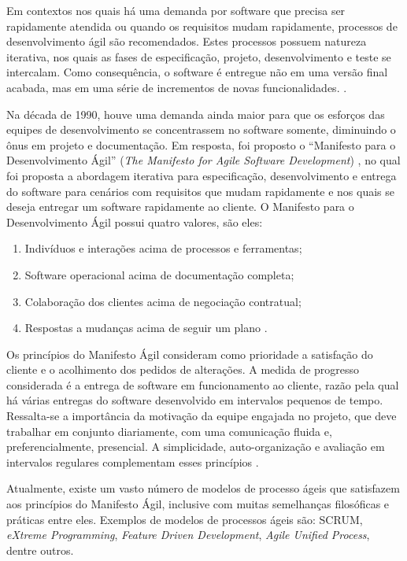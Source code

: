 Em contextos nos quais há uma demanda por software que precisa ser rapidamente atendida ou quando os requisitos mudam rapidamente, processos de desenvolvimento ágil são recomendados. Estes processos possuem natureza iterativa, nos quais as fases de especificação, projeto, desenvolvimento e teste se intercalam. Como consequência, o software é entregue não em uma versão final acabada, mas em uma série de incrementos de novas funcionalidades.
\cite{Sommerville:Livro}.

Na década de 1990, houve uma demanda ainda maior para que os esforços das equipes de desenvolvimento se concentrassem no software somente, diminuindo o ônus em projeto e documentação. Em resposta, foi proposto o  ``Manifesto para o Desenvolvimento Ágil'' (\textit{The Manifesto for Agile Software Development}) \cite{KentBeck:ManifestoAgil}, no qual foi proposta a abordagem iterativa para especificação, desenvolvimento e entrega do software para cenários com requisitos que mudam rapidamente e nos quais se deseja entregar um software rapidamente ao cliente. O Manifesto para o Desenvolvimento Ágil possui quatro valores, são eles:

\begin{enumerate}
	\item Indivíduos e interações acima de processos e ferramentas;
	\item Software operacional acima de documentação completa;
	\item Colaboração dos clientes acima de negociação contratual;
	\item Respostas a mudanças acima de seguir um plano \cite{Pressman:Livro}.
\end{enumerate}

Os princípios do Manifesto Ágil consideram como prioridade a satisfação do cliente e o acolhimento dos pedidos de alterações. A medida de progresso considerada é a entrega de software em funcionamento ao cliente, razão pela qual há várias entregas do software desenvolvido em intervalos pequenos de tempo. Ressalta-se a importância da motivação da equipe engajada no projeto, que deve trabalhar em conjunto diariamente, com uma comunicação fluida e, preferencialmente, presencial. A simplicidade, auto-organização e avaliação em intervalos regulares complementam esses princípios \cite{KentBeck:ManifestoAgil}.

Atualmente, existe um vasto número de modelos de processo ágeis que satisfazem aos princípios do Manifesto Ágil, inclusive com muitas semelhanças filosóficas e práticas entre eles. Exemplos de modelos de processos ágeis são: SCRUM, \emph{eXtreme Programming}, \emph{Feature Driven Development}, \emph{Agile Unified Process}, dentre outros.

